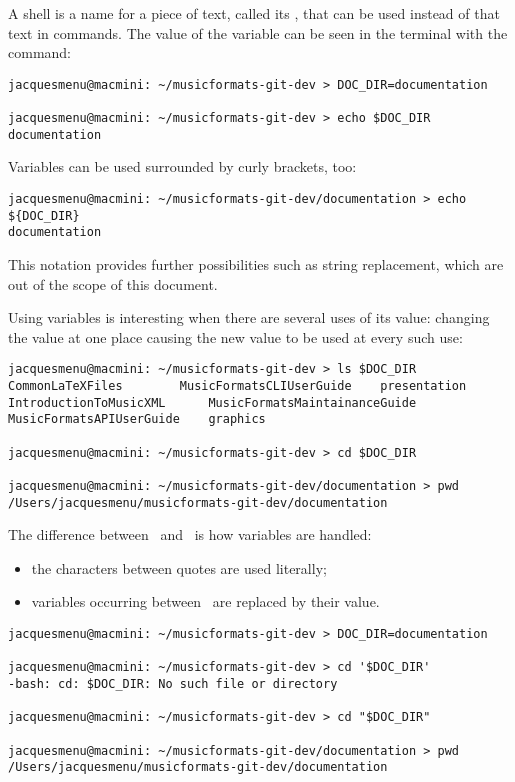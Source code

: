 A shell  is a name for a piece of text, called its , that can be used instead of that text in commands. The value of the variable can be seen in the terminal with the  command:
\begin{lstlisting}[language=Terminal]
jacquesmenu@macmini: ~/musicformats-git-dev > DOC_DIR=documentation

jacquesmenu@macmini: ~/musicformats-git-dev > echo $DOC_DIR
documentation
\end{lstlisting}

Variables can be used surrounded by curly brackets, too:
\begin{lstlisting}[language=Terminal]
jacquesmenu@macmini: ~/musicformats-git-dev/documentation > echo ${DOC_DIR}
documentation
\end{lstlisting}
This notation provides further possibilities such as string replacement, which are out of the scope of this document.

Using variables is interesting when there are several uses of its value: changing the value at one place causing the new value to be used at every such use:
\begin{lstlisting}[language=Terminal]
jacquesmenu@macmini: ~/musicformats-git-dev > ls $DOC_DIR
CommonLaTeXFiles		MusicFormatsCLIUserGuide	presentation
IntroductionToMusicXML		MusicFormatsMaintainanceGuide
MusicFormatsAPIUserGuide	graphics

jacquesmenu@macmini: ~/musicformats-git-dev > cd $DOC_DIR

jacquesmenu@macmini: ~/musicformats-git-dev/documentation > pwd
/Users/jacquesmenu/musicformats-git-dev/documentation
\end{lstlisting}

The difference between \quotes\ and \doubleQuotes\ is how variables are handled:
\begin{itemize}
\item the characters between quotes are used literally;
\item variables occurring between \doubleQuotes\ are replaced by their value.
\end{itemize}

\begin{lstlisting}[language=Terminal]
jacquesmenu@macmini: ~/musicformats-git-dev > DOC_DIR=documentation

jacquesmenu@macmini: ~/musicformats-git-dev > cd '$DOC_DIR'
-bash: cd: $DOC_DIR: No such file or directory

jacquesmenu@macmini: ~/musicformats-git-dev > cd "$DOC_DIR"

jacquesmenu@macmini: ~/musicformats-git-dev/documentation > pwd
/Users/jacquesmenu/musicformats-git-dev/documentation
\end{lstlisting}

